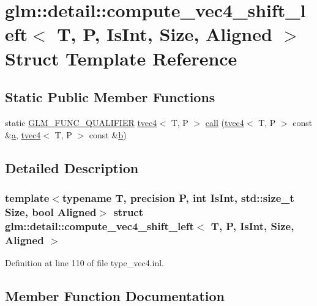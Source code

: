 \hypertarget{structglm_1_1detail_1_1compute__vec4__shift__left}{}\section{glm\+::detail\+::compute\+\_\+vec4\+\_\+shift\+\_\+left$<$ T, P, Is\+Int, Size, Aligned $>$ Struct Template Reference}
\label{structglm_1_1detail_1_1compute__vec4__shift__left}
\subsection*{Static Public Member Functions}
\begin{DoxyCompactItemize}
\item 
static \mbox{\hyperlink{setup_8hpp_a33fdea6f91c5f834105f7415e2a64407}{G\+L\+M\+\_\+\+F\+U\+N\+C\+\_\+\+Q\+U\+A\+L\+I\+F\+I\+ER}} \mbox{\hyperlink{structglm_1_1tvec4}{tvec4}}$<$ T, P $>$ \mbox{\hyperlink{structglm_1_1detail_1_1compute__vec4__shift__left_aeecda8303fb8efb3bf724be43cc15329}{call}} (\mbox{\hyperlink{structglm_1_1tvec4}{tvec4}}$<$ T, P $>$ const \&\mbox{\hyperlink{glad_8h_ac8729153468b5dcf13f971b21d84d4e5}{a}}, \mbox{\hyperlink{structglm_1_1tvec4}{tvec4}}$<$ T, P $>$ const \&\mbox{\hyperlink{glad_8h_a6eba317e3cf44d6d26c04a5a8f197dcb}{b}})
\end{DoxyCompactItemize}


\subsection{Detailed Description}
\subsubsection*{template$<$typename T, precision P, int Is\+Int, std\+::size\+\_\+t Size, bool Aligned$>$\newline
struct glm\+::detail\+::compute\+\_\+vec4\+\_\+shift\+\_\+left$<$ T, P, Is\+Int, Size, Aligned $>$}



Definition at line 110 of file type\+\_\+vec4.\+inl.



\subsection{Member Function Documentation}
\mbox{\label{structglm_1_1detail_1_1compute__vec4__shift__left_aeecda8303fb8efb3bf724be43cc15329}} 
